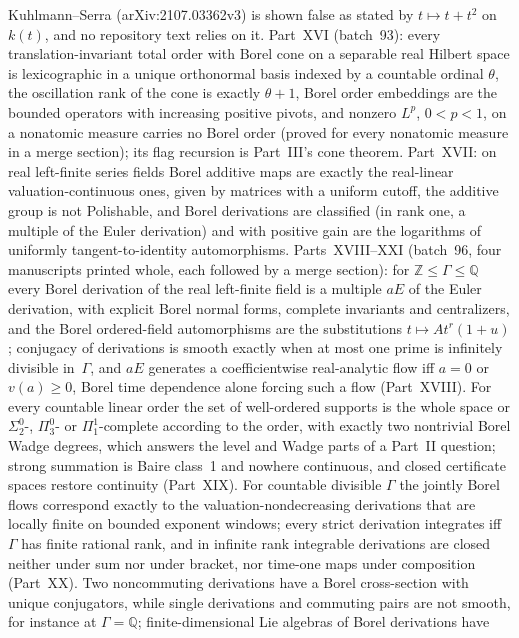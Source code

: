 \documentclass[11pt]{article}
\newcommand{\Q}{\mathbb{Q}}
\newcommand{\Z}{\mathbb{Z}}
\begin{document}
{Kuhlmann--Serra (arXiv:2107.03362v3) is shown false as stated by
$t\mapsto t+t^2$ on $k(t)$, and no repository text relies on it.
Part~XVI (batch~93): every translation-invariant total order with Borel
cone on a separable real Hilbert space is
lexicographic in a unique orthonormal basis indexed by a countable ordinal
$\theta$, the oscillation rank of the cone is exactly $\theta+1$, Borel
order embeddings are the bounded operators with increasing positive
pivots, and nonzero $L^p$, $0<p<1$, on a nonatomic measure carries no Borel
order (proved for every nonatomic measure in a merge section); its flag
recursion is Part~III's cone theorem.  Part~XVII: on real left-finite
series fields Borel additive maps are exactly the real-linear
valuation-continuous ones, given by matrices with a uniform cutoff, the
additive group is not Polishable, and Borel derivations are classified (in
rank one, a multiple of the Euler derivation) and with positive gain are
the logarithms of uniformly tangent-to-identity automorphisms.
Parts~XVIII--XXI (batch~96, four manuscripts printed whole, each followed
by a merge section): for $\Z\le\Gamma\le\Q$ every Borel derivation of the
real left-finite field is a multiple $aE$ of the Euler derivation, with
explicit Borel normal forms, complete invariants and centralizers, and the
Borel ordered-field automorphisms are the substitutions
$t\mapsto At^r(1+u)$; conjugacy of derivations is smooth exactly when at
most one prime is infinitely divisible in~$\Gamma$, and $aE$ generates a
coefficientwise real-analytic flow iff $a=0$ or $v(a)\ge0$, Borel time
dependence alone forcing such a flow (Part~XVIII).  For every countable
linear order the set of well-ordered supports is the whole space or
$\Sigma^0_2$-, $\Pi^0_3$- or $\Pi^1_1$-complete according to the order,
with exactly two nontrivial Borel Wadge degrees, which answers the level
and Wadge parts of a Part~II question; strong summation is Baire class~1
and nowhere continuous, and closed certificate spaces restore continuity
(Part~XIX).  For countable divisible $\Gamma$ the jointly Borel flows
correspond exactly to the valuation-nondecreasing derivations that are
locally finite on bounded exponent windows; every strict derivation
integrates iff $\Gamma$ has finite rational rank, and in infinite rank
integrable derivations are closed neither under sum nor under bracket, nor
time-one maps under composition (Part~XX).  Two noncommuting derivations
have a Borel cross-section with unique conjugators, while single
derivations and commuting pairs are not smooth, for instance at
$\Gamma=\Q$; finite-dimensional Lie algebras of Borel derivations have
}
\end{document}
